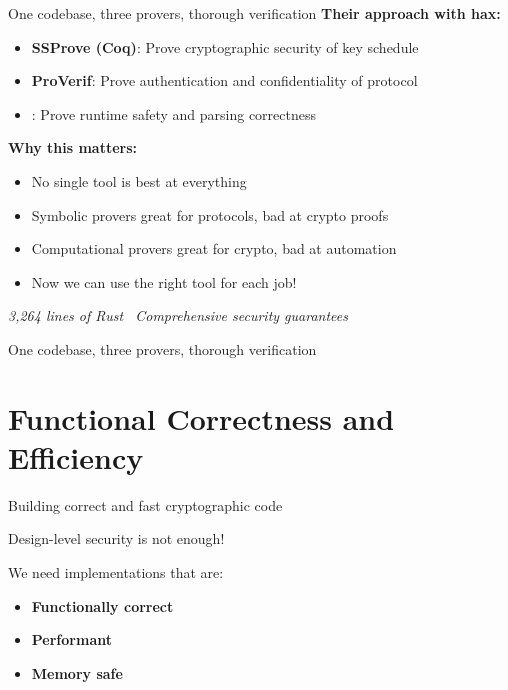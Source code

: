 \documentclass[aspectratio=169, lualatex, handout]{beamer}
\begin{document}
\begin{frame}{One codebase, three provers, thorough verification}
	\textbf{Their approach with hax:}
	\begin{itemize}
		\item \textbf{SSProve (Coq)}: Prove cryptographic security of key schedule
		\item \textbf{ProVerif}: Prove authentication and confidentiality of protocol
		\item \textbf{\fstar}: Prove runtime safety and parsing correctness
	\end{itemize}
	\vspace{0.5em}
	\textbf{Why this matters:}
	\begin{itemize}
		\item No single tool is best at everything
		\item Symbolic provers great for protocols, bad at crypto proofs
		\item Computational provers great for crypto, bad at automation
		\item Now we can use the right tool for each job!
	\end{itemize}
	\vspace{0.5em}
	\begin{center}
		\textit{3,264 lines of Rust \rightarrow\ Comprehensive security guarantees}
	\end{center}
\end{frame}

\begin{frame}{One codebase, three provers, thorough verification}
\end{frame}

\section{Functional Correctness and Efficiency}

\begin{frame}{Building correct and fast cryptographic code}
	\begin{center}
		\Large
		Design-level security is not enough!

		\vspace{1em}

		We need implementations that are:
		\begin{itemize}
			\item \textbf{Functionally correct}
			\item \textbf{Performant}
			\item \textbf{Memory safe}
		\end{itemize}
	\end{center}
\end{frame}
\end{document}

